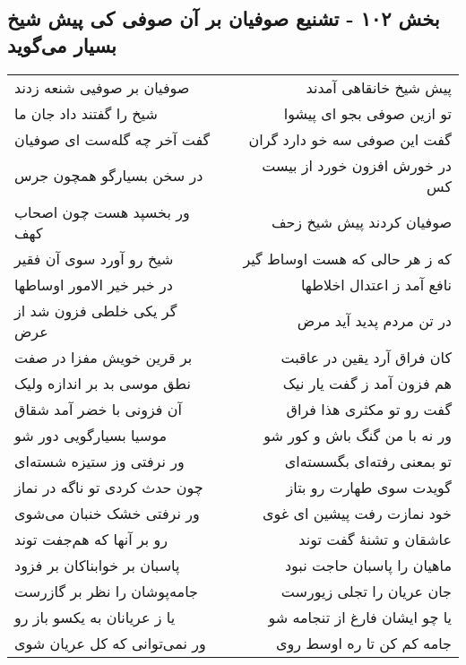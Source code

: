 \begin{center}
\section*{بخش ۱۰۲ - تشنیع صوفیان بر آن صوفی کی پیش شیخ بسیار می‌گوید}
\label{sec:sh102}
\begin{longtable}{l p{0.5cm} r}
صوفیان بر صوفیی شنعه زدند
&&
پیش شیخ خانقاهی آمدند
\\
شیخ را گفتند داد جان ما
&&
تو ازین صوفی بجو ای پیشوا
\\
گفت آخر چه گله‌ست ای صوفیان
&&
گفت این صوفی سه خو دارد گران
\\
در سخن بسیارگو همچون جرس
&&
در خورش افزون خورد از بیست کس
\\
ور بخسپد هست چون اصحاب کهف
&&
صوفیان کردند پیش شیخ زحف
\\
شیخ رو آورد سوی آن فقیر
&&
که ز هر حالی که هست اوساط گیر
\\
در خبر خیر الامور اوساطها
&&
نافع آمد ز اعتدال اخلاطها
\\
گر یکی خلطی فزون شد از عرض
&&
در تن مردم پدید آید مرض
\\
بر قرین خویش مفزا در صفت
&&
کان فراق آرد یقین در عاقبت
\\
نطق موسی بد بر اندازه ولیک
&&
هم فزون آمد ز گفت یار نیک
\\
آن فزونی با خضر آمد شقاق
&&
گفت رو تو مکثری هذا فراق
\\
موسیا بسیارگویی دور شو
&&
ور نه با من گنگ باش و کور شو
\\
ور نرفتی وز ستیزه شسته‌ای
&&
تو بمعنی رفته‌ای بگسسته‌ای
\\
چون حدث کردی تو ناگه در نماز
&&
گویدت سوی طهارت رو بتاز
\\
ور نرفتی خشک خنبان می‌شوی
&&
خود نمازت رفت پیشین ای غوی
\\
رو بر آنها که هم‌جفت توند
&&
عاشقان و تشنهٔ گفت توند
\\
پاسبان بر خوابناکان بر فزود
&&
ماهیان را پاسبان حاجت نبود
\\
جامه‌پوشان را نظر بر گازرست
&&
جان عریان را تجلی زیورست
\\
یا ز عریانان به یکسو باز رو
&&
یا چو ایشان فارغ از تنجامه شو
\\
ور نمی‌توانی که کل عریان شوی
&&
جامه کم کن تا ره اوسط روی
\\
\end{longtable}
\end{center}
